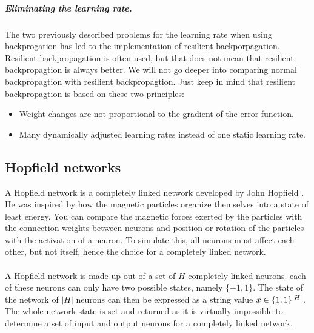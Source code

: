 \documentclass[pdftex,a4paper,12pt,twoside]{report}
\theoremstyle{plain} \newtheorem{theorem}{Theorem} \newtheorem{proposition}{Proposition} \newtheorem{lemma}{Lemma} \newtheorem*{corollary}{Corollary}
\theoremstyle{definition} \newtheorem{definition}{Definition} \newtheorem{conjecture}{Conjecture} \newtheorem*{example}{Example} \newtheorem{algorithm}{Algorithm}
\theoremstyle{remark} \newtheorem*{remark}{Remark} \newtheorem*{note}{Note} \newtheorem{case}{Case}
\begin{document}
\subparagraph{Eliminating the learning rate.}
The two previously described problems for the learning rate when using backprogation has led to the implementation of resilient backporpagation. Resilient backpropagation is often used, but that does not mean that resilient backpropagtion is always better. We will not go deeper into comparing normal backpropagtion with resilient backpropagtion. Just keep in mind that resilient backpropagtion is based on these two principles:
\begin{itemize}
\item Weight changes are not proportional to the gradient of the error function.
\item Many dynamically adjusted learning rates instead of one static learning rate.
\end{itemize}
\subsection{Hopfield networks}
A Hopfield network is a completely linked network developed by John Hopfield \citep{Hopfield1982}. He was inspired by how the magnetic particles organize themselves into a state of least energy. You can compare the magnetic forces exerted by the particles with the connection weights between neurons and position or rotation of the particles with the activation of a neuron. To simulate this, all neurons must affect each other, but not itself, hence the choice for a completely linked network. \\\\
A Hopfield network is made up out of a set of $H$ completely linked neurons. each of these neurons can only have two possible states, namely $\{-1,1\}$. The state of the network of $|H|$ neurons can then be expressed as a string value $x \in \{\-1,1\}^{|H|}$. The whole network state is set and returned as it is virtually impossible to determine a set of input and output neurons for a completely linked network.
\end{document}
